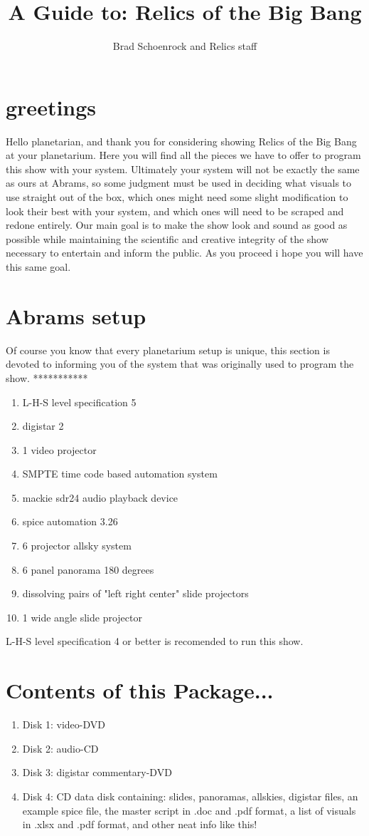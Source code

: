 \documentclass{article}
\title{A Guide to: Relics of the Big Bang}
\author{Brad Schoenrock and Relics staff}
\date{}
\begin{document}
\maketitle
\section{greetings}
Hello planetarian, and thank you for considering showing Relics of the Big Bang at your planetarium. Here you will find all the pieces we have to offer to program this show with your system. Ultimately your system will not be exactly the same as ours at Abrams, so some judgment must be used in deciding what visuals to use straight out of the box, which ones might need some slight modification to look their best with your system, and which ones will need to be scraped and redone entirely. Our main goal is to make the show look and sound as good as possible while maintaining the scientific and creative integrity of the show necessary to entertain and inform the public. As you proceed i hope you will have this same goal. 
\section{Abrams setup}
Of course you know that every planetarium setup is unique, this section is devoted to informing you of the system that was originally used to program the show. 
***********
\begin{enumerate}
\item L-H-S level specification 5
\item digistar 2
\item 1 video projector
\item SMPTE time code based automation system
\item mackie sdr24 audio playback device
\item spice automation 3.26
\item 6 projector allsky system
\item 6 panel panorama 180 degrees
\item dissolving pairs of "left right center" slide projectors
\item 1 wide angle slide projector
\end{enumerate}
L-H-S level specification 4 or better is recomended to run this show. 
\section{Contents of this Package...}
\begin{enumerate}
\item Disk 1: video-DVD
\item Disk 2: audio-CD
\item Disk 3: digistar commentary-DVD
\item Disk 4: CD data disk containing: slides, panoramas, allskies, digistar files, an example spice file, the master script in .doc and .pdf format, a list of visuals in .xlsx and .pdf format, and other neat info like this! 
\end{enumerate}
\end{document}
